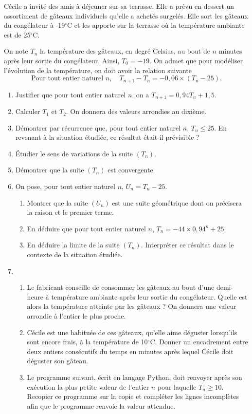 \documentclass[11pt,fleqn, openany]{book} %
\begin{document}
\begin{exercise}[topic=lim14, subtitle={(Métropole 2021)}]
Cécile a invité des amis à déjeuner sur sa terrasse. Elle a prévu en dessert un assortiment de gâteaux individuels qu'elle a achetés surgelés. Elle sort les gâteaux du congélateur à -19$^{\circ}$C et les apporte sur la terrasse où la température 
ambiante est de 25$^{\circ}$C. 

On note $T_n$ la température des gâteaux, en degré Celsius, au bout de $n$ minutes après leur sortie du congélateur. Ainsi, $T_0=-19$. On admet que pour modéliser l'évolution de la température, on doit avoir la relation suivante
\[ \text{Pour tout entier naturel }n,\quad T_{n+1} - T_n = -0,06 \times (T_n - 25).\]
\begin{enumerate}
\item Justifier que pour tout entier naturel $n$, on a $T_{n+1}=0,94T_n+1,5$.
\item Calculer $T_1$ et $T_2$. On donnera des valeurs arrondies au dixième.
\item Démontrer par récurrence que, pour tout entier naturel $n$, $T_n \leqslant 25$. En revenant à la situation étudiée, ce résultat était-il prévisible ?
\item Étudier le sens de variations de la suite $(T_n)$.
\item Démontrer que la suite $(T_n)$ est convergente.
\item On pose, pour tout entier naturel $n$, $U_n=T_n-25$.
\begin{enumerate}
\item Montrer que la suite $(U_n)$ est une suite géométrique dont on précisera la raison et le premier terme.
\item En déduire que pour tout entier naturel $n$, $T_n=-44\times 0,94^n+25$.
\item En déduire la limite de la suite $(T_n)$. Interpréter ce résultat dans le contexte de la situation étudiée.
\end{enumerate}
\item \begin{enumerate}
\item Le fabricant conseille de consommer les gâteaux au bout d'une demi-heure à 
température ambiante après leur sortie du congélateur. Quelle est alors la 
température atteinte par les gâteaux ? On donnera une valeur arrondie à l'entier le 
plus proche.
\item  Cécile est une habituée de ces gâteaux, qu'elle aime déguster lorsqu'ils sont encore frais, à la température de 10$^{\circ}$C. Donner un encadrement entre deux entiers  consécutifs du temps en minutes après lequel Cécile doit déguster son gâteau. 
\item Le programme suivant, écrit en langage Python, doit renvoyer après son exécution la plus petite valeur de l'entier $n$ pour laquelle $T_n\geqslant 10$. Recopier ce programme sur la copie et compléter les lignes incomplètes  afin que le programme renvoie la  valeur attendue.



\end{enumerate}
\end{enumerate}
\end{exercise}
\end{document}
